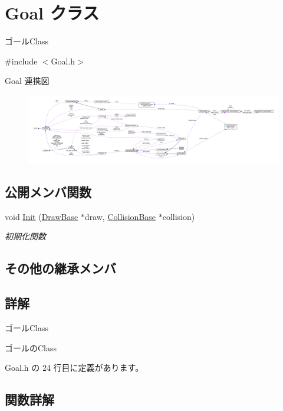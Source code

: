 \hypertarget{class_goal}{}\section{Goal クラス}
\label{class_goal}


ゴール\+Class  




{\ttfamily \#include $<$Goal.\+h$>$}



Goal 連携図\nopagebreak
\begin{figure}[H]
\begin{center}
\leavevmode
\includegraphics[width=350pt]{class_goal__coll__graph}
\end{center}
\end{figure}
\subsection*{公開メンバ関数}
\begin{DoxyCompactItemize}
\item 
void \mbox{\hyperlink{class_goal_a694beb5a9164e2bea59fc43affbaa060}{Init}} (\mbox{\hyperlink{class_draw_base}{Draw\+Base}} $\ast$draw, \mbox{\hyperlink{class_collision_base}{Collision\+Base}} $\ast$collision)
\begin{DoxyCompactList}\small\item\em 初期化関数 \end{DoxyCompactList}\end{DoxyCompactItemize}
\subsection*{その他の継承メンバ}


\subsection{詳解}
ゴール\+Class 

ゴールの\+Class 

 Goal.\+h の 24 行目に定義があります。



\subsection{関数詳解}
\mbox{\label{class_goal_a694beb5a9164e2bea59fc43affbaa060}} 
